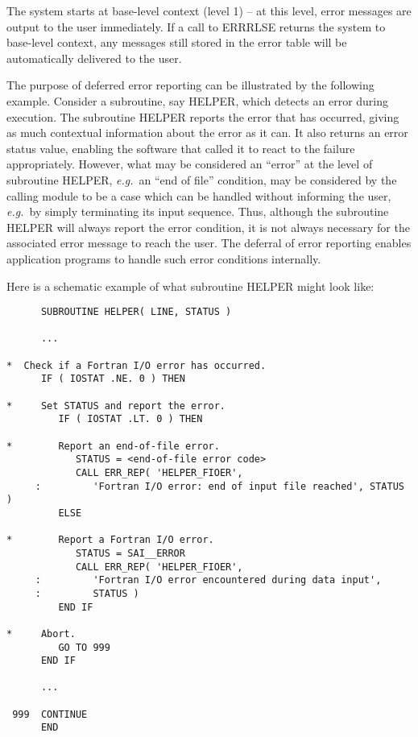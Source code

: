 \documentclass[twoside,11pt]{article}
\renewcommand{\_}{\texttt{\symbol{95}}}
\begin{document}
The system starts at base-level context (level 1) -- at this level, error
messages are output to the user immediately.
If a call to ERR\_RLSE returns the system to base-level context, any messages
still stored in the error table will be automatically delivered to the user.

The purpose of deferred error reporting can be illustrated by the following
example.
Consider a subroutine, say HELPER, which detects an error during execution.
The subroutine HELPER reports the error that has occurred, giving as much
contextual information about the error as it can.
It also returns an error status value, enabling the software that called it
to react to the failure appropriately.
However, what may be considered an ``error'' at the level of subroutine
HELPER, \textit{e.g.}\ an ``end of file'' condition, may be considered by the
calling module to be a case which can be handled without informing the user,
\textit{e.g.}\ by simply terminating its input sequence.
Thus, although the subroutine HELPER will always report the error condition,
it is not always necessary for the associated error message to reach the
user.
The deferral of error reporting enables application programs to handle such
error conditions internally.

Here is a schematic example of what subroutine HELPER might look like:

\begin {small}
\begin{verbatim}
      SUBROUTINE HELPER( LINE, STATUS )

      ...

*  Check if a Fortran I/O error has occurred.
      IF ( IOSTAT .NE. 0 ) THEN

*     Set STATUS and report the error.
         IF ( IOSTAT .LT. 0 ) THEN

*        Report an end-of-file error.
            STATUS = <end-of-file error code>
            CALL ERR_REP( 'HELPER_FIOER',
     :         'Fortran I/O error: end of input file reached', STATUS )
         ELSE

*        Report a Fortran I/O error.
            STATUS = SAI__ERROR
            CALL ERR_REP( 'HELPER_FIOER',
     :         'Fortran I/O error encountered during data input',
     :         STATUS )
         END IF

*     Abort.
         GO TO 999
      END IF

      ...

 999  CONTINUE
      END
\end{verbatim}
\end {small}
\end{document}
